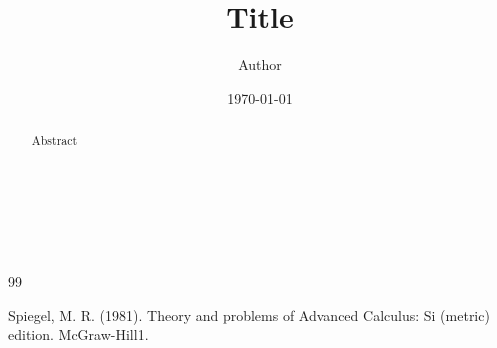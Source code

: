 \documentclass[10pt,leqno]{amsart}
\begin{document}
\title{Title} %
\author[Initial Surname]{Author}
\date{\today}
\address{Address}
\maketitle

\let\thefootnote\relax
{} %

\begin{abstract}
Abstract 
\end{abstract} %

\bigskip

\noindent \lipsum[1] \cite{1}

$\,$

$\,$

\begin{thebibliography}{99}

 Spiegel, M. R. (1981). Theory and problems of Advanced Calculus: Si (metric) edition. McGraw-Hill1. 

\end{thebibliography}
\end{document}
